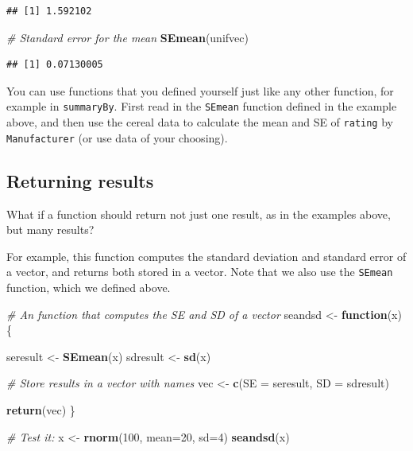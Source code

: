 \documentclass[]{book}
\newenvironment{Shaded}{\begin{snugshade}}{\end{snugshade}}
\newcommand{\CommentTok}[1]{\textcolor[rgb]{0.56,0.35,0.01}{\textit{#1}}}
\newcommand{\ControlFlowTok}[1]{\textcolor[rgb]{0.13,0.29,0.53}{\textbf{#1}}}
\newcommand{\DataTypeTok}[1]{\textcolor[rgb]{0.13,0.29,0.53}{#1}}
\newcommand{\DecValTok}[1]{\textcolor[rgb]{0.00,0.00,0.81}{#1}}
\newcommand{\KeywordTok}[1]{\textcolor[rgb]{0.13,0.29,0.53}{\textbf{#1}}}
\newcommand{\NormalTok}[1]{#1}
\newcommand{\StringTok}[1]{\textcolor[rgb]{0.31,0.60,0.02}{#1}}
\let\BeginKnitrBlock\begin \let\EndKnitrBlock\end
\begin{document}
\begin{verbatim}
## [1] 1.592102
\end{verbatim}

\begin{Shaded}
\begin{Highlighting}[]
\CommentTok{# Standard error for the mean}
\KeywordTok{SEmean}\NormalTok{(unifvec)}
\end{Highlighting}
\end{Shaded}

\begin{verbatim}
## [1] 0.07130005
\end{verbatim}

\BeginKnitrBlock{rmdtry}
You can use functions that you defined yourself just like any other function, for example in \texttt{summaryBy}. First read in the \texttt{SEmean} function defined in the example above, and then use the cereal data to calculate the mean and SE of \texttt{rating} by \texttt{Manufacturer} (or use data of your choosing).
\EndKnitrBlock{rmdtry}

\hypertarget{returning-results}{%
\subsection{Returning results}\label{returning-results}}

What if a function should return not just one result, as in the examples above, but many results?

For example, this function computes the standard deviation and standard error of a vector, and returns both stored in a vector. Note that we also use the \texttt{SEmean} function, which we defined above.

\begin{Shaded}
\begin{Highlighting}[]
\CommentTok{# An function that computes the SE and SD of a vector}
\NormalTok{seandsd <-}\StringTok{ }\ControlFlowTok{function}\NormalTok{(x)\{}
  
\NormalTok{  seresult <-}\StringTok{ }\KeywordTok{SEmean}\NormalTok{(x)}
\NormalTok{  sdresult <-}\StringTok{ }\KeywordTok{sd}\NormalTok{(x)}

  \CommentTok{# Store results in a vector with names}
\NormalTok{  vec <-}\StringTok{ }\KeywordTok{c}\NormalTok{(}\DataTypeTok{SE =}\NormalTok{ seresult, }\DataTypeTok{SD =}\NormalTok{ sdresult)}

\KeywordTok{return}\NormalTok{(vec)}
\NormalTok{\}}

\CommentTok{# Test it:}
\NormalTok{x <-}\StringTok{ }\KeywordTok{rnorm}\NormalTok{(}\DecValTok{100}\NormalTok{, }\DataTypeTok{mean=}\DecValTok{20}\NormalTok{, }\DataTypeTok{sd=}\DecValTok{4}\NormalTok{)}
\KeywordTok{seandsd}\NormalTok{(x)}
\end{Highlighting}
\end{Shaded}
\end{document}
